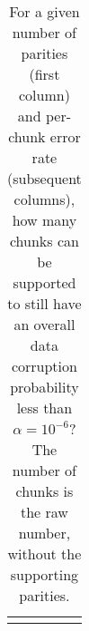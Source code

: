 \hypertarget{tbl:baseline-param}{}
\begin{longtable}[]{@{}
  >{\raggedleft\arraybackslash}p{}
  >{\raggedleft\arraybackslash}p{}
  >{\raggedleft\arraybackslash}p{}
  >{\raggedleft\arraybackslash}p{}
  >{\raggedleft\arraybackslash}p{}@{}}
\caption{\label{tbl:baseline-param}For a given number of parities (first
column) and per-chunk error rate (subsequent columns), how many chunks
can be supported to still have an overall data corruption probability
less than \(\alpha = 10^{-6}\)? The number of chunks is the raw number,
without the supporting parities.}\tabularnewline
\toprule\noalign{}


\end{longtable}
